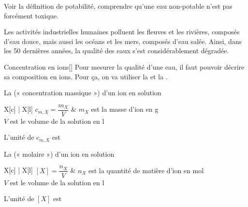 \teteTermStssEnvi
\vspace*{-36pt}

\begin{objectifs}
  \item Voir la définition de potabilité, comprendre qu'une eau non-potable n'est pas forcément toxique.
\end{objectifs}

\begin{contexte}
  Les activités industrielles humaines polluent les fleuves et les rivières, composés d'eau douce, mais aussi les océans et les mers, composés d'eau salée.
  Ainsi, dans les 50 dernières années, la qualité des eaux s'est considérablement dégradée.
  
\end{contexte}


\begin{doc}{Concentration en ions}[\label{doc:concentration_eau}]
  Pour mesurer la qualité d'une eau, il faut pouvoir décrire sa composition en ions.
  Pour ça, on va utiliser la 
  et la .

  \begin{importants}  
    La  (« concentration massique ») d'un ion en solution
    \begin{center}
      \begin{tblr}{X[c] | X[l]}
        $c_{m,X} = \dfrac{m_X}{V}$ &
        { $m_X$ est la masse d'ion en \unit{\g} \\
        $V$ est le volume de la solution en \unit{\litre} }
      \end{tblr}
    \end{center}
    L'unité de $c_{m,X}$ est \texteTrou[0.1]{\unit{\g\per\litre}}
  \end{importants}
  \begin{importants}  
    La  (« molaire ») d'un ion en solution
    \begin{center}
      \begin{tblr}{X[c] | X[l]}
        $[X] = \dfrac{n_X}{V}$ &
        { $n_X$ est la quantité de matière d'ion en \unit{\mole} \\
        $V$ est le volume de la solution en \unit{\litre} }
      \end{tblr}
    \end{center}
    L'unité de $[X]$ est \texteTrou[0.1]{\unit{\mole\per\litre}}
  \end{importants}
\end{doc}

